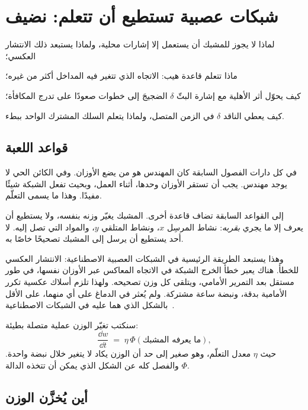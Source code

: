 \chapter{شبكات عصبية تستطيع أن تتعلم: نضيف }
\label{sec:dofa}
\begin{chaptergoals}
\item لماذا لا يجوز للمشبك أن يستعمل إلا إشارات محلية، ولماذا يستبعد ذلك الانتشار العكسي؛
\item ماذا تتعلم قاعدة هيب: الاتجاه الذي تتغير فيه المداخل أكثر من غيره؛
\item كيف يحوّل أثر الأهلية مع إشارة البثّ $\delta$ الضجيجَ إلى خطوات صعودًا على تدرج المكافأة؛
\item كيف يعطي الناقد $\delta$ في الزمن المتصل، ولماذا يتعلم السلك المشترك الواحد ببطء.
\end{chaptergoals}

\section{قواعد اللعبة}

في كل دارات الفصول السابقة كان المهندس هو من يضع الأوزان. وفي الكائن الحي لا يوجد مهندس. يجب أن تستقر الأوزان وحدها، أثناء العمل، وبحيث تفعل الشبكة شيئًا مفيدًا. وهذا ما يسمى التعلّم.

إلى القواعد السابقة تضاف قاعدة أخرى. المشبك يغيّر وزنه بنفسه، ولا يستطيع أن يعرف إلا ما يجري \emph{بقربه}: نشاط المرسِل $x$، ونشاط المتلقي $y$، والمواد التي تصل إليه. لا أحد يستطيع أن يرسل إلى المشبك تصحيحًا خاصًا به.

وهذا يستبعد الطريقة الرئيسية في الشبكات العصبية الاصطناعية: الانتشار العكسي للخطأ. هناك يعبر خطأ الخرج الشبكة في الاتجاه المعاكس عبر الأوزان نفسها، في طور مستقل بعد التمرير الأمامي، ويتلقى كل وزن تصحيحه. ولهذا تلزم أسلاك عكسية تكرر الأمامية بدقة، ونبضة ساعة مشتركة. ولم يُعثر في الدماغ على أي منهما، على الأقل بالشكل الذي هما عليه في الشبكات الاصطناعية~\cite{Lillicrap2020,WhittingtonBogacz2019}.

سنكتب تغيّر الوزن عملية متصلة بطيئة:
\begin{equation}
\frac{\dd w}{\dd t} \;=\; \eta\,\Phi(\text{ما يعرفه المشبك}),
\label{eq:plasticity}
\end{equation}
حيث $\eta$ معدل التعلّم، وهو صغير إلى حد أن الوزن يكاد لا يتغير خلال نبضة واحدة. والفصل كله عن الشكل الذي يمكن أن تتخذه الدالة $\Phi$.

\section{أين يُخزَّن الوزن}
\label{sec:weightstore}

